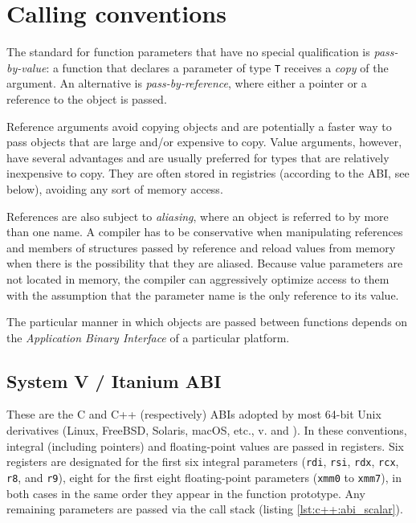 \section{Calling conventions}

The standard for function parameters that have no special qualification is
\textit{pass-by-value}: a function that declares a parameter of type \texttt{T}
receives a \emph{copy} of the argument.  An alternative is
\textit{pass-by-reference}, where either a pointer or a reference to the object
is passed.

Reference arguments avoid copying objects and are potentially a faster way to
pass objects that are large and/or expensive to copy.  Value arguments, however,
have several advantages and are usually preferred for types that are relatively
inexpensive to copy.  They are often stored in registries (according to the ABI,
see below), avoiding any sort of memory access.

References are also subject to \textit{aliasing}, where an object is referred to
by more than one name.  A compiler has to be conservative when manipulating
references and members of structures passed by reference and reload values from
memory when there is the possibility that they are aliased.  Because value
parameters are not located in memory, the compiler can aggressively optimize
access to them with the assumption that the parameter name is the only reference
to its value.

The particular manner in which objects are passed between functions depends on
the \textit{Application Binary Interface} of a particular platform.

\subsection{System V / Itanium ABI}

These are the C and C++ (respectively) ABIs adopted by most 64-bit Unix
derivatives (Linux, FreeBSD, Solaris, macOS, etc., v. \cite{SystemV2012} and
\cite{Itanium2017}).  In these conventions, integral (including pointers) and
floating-point values are passed in registers.  Six registers are designated for
the first six integral parameters (\texttt{rdi}, \texttt{rsi}, \texttt{rdx},
\texttt{rcx}, \texttt{r8}, and \texttt{r9}), eight for the first eight
floating-point parameters (\texttt{xmm0} to \texttt{xmm7}), in both cases in the
same order they appear in the function prototype.  Any remaining parameters are
passed via the call stack (listing \ref{lst:c++:abi_scalar}).

